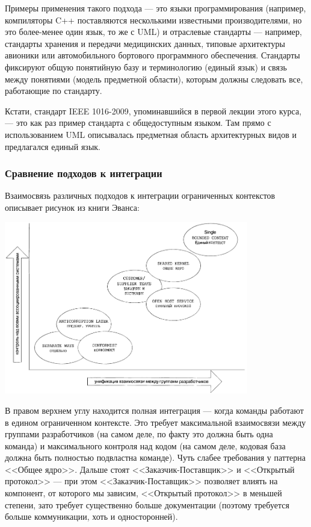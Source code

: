 \documentclass{../../text-style}
\begin{document}
Примеры применения такого подхода --- это языки программирования (например, компиляторы C++ поставляются несколькими известными производителями, но это более-менее один язык, то же с UML) и отраслевые стандарты --- например, стандарты хранения и передачи медицинских данных, типовые архитектуры авионики или автомобильного бортового программного обеспечения. Стандарты фиксируют общую понятийную базу и терминологию (единый язык) и связь между понятиями (модель предметной области), которым должны следовать все, работающие по стандарту. 

Кстати, стандарт IEEE 1016-2009, упоминавшийся в первой лекции этого курса, --- это как раз пример стандарта с общедоступным языком. Там прямо с использованием UML описывалась предметная область архитектурных видов и предлагался единый язык.

\subsubsection{Сравнение подходов к интеграции}

Взаимосвязь различных  подходов к интеграции ограниченных контекстов описывает рисунок из книги Эванса: 

\begin{center}
    \includegraphics[width=0.8\textwidth]{integrationPatterns.png}
\end{center}

В правом верхнем углу находится полная интеграция --- когда команды работают в едином ограниченном контексте. Это требует максимальной взаимосвязи между группами разработчиков (на самом деле, по факту это должна быть одна команда) и максимального контроля над кодом (на самом деле, кодовая база должна быть полностью подвластна команде). Чуть слабее требования у паттерна <<Общее ядро>>. Дальше стоят <<Заказчик-Поставщик>> и <<Открытый протокол>> --- при этом <<Заказчик-Поставщик>> позволяет влиять на компонент, от которого мы зависим, <<Открытый протокол>> в меньшей степени, зато требует существенно больше документации (поэтому требуется больше коммуникации, хоть и односторонней).
\end{document}
